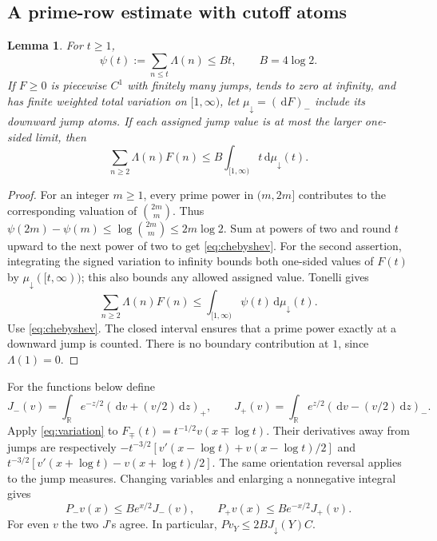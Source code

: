 \documentclass[11pt]{article}
\newtheorem{lemma}[theorem]{Lemma}
\theoremstyle{remark}\newtheorem{remark}[theorem]{Remark}
\newcommand{\R}{\mathbb R}
\newcommand{\dd}{\,\mathrm d}
\numberwithin{equation}{section}
\begin{document}
\subsection{A prime-row estimate with cutoff atoms}
\begin{lemma}\label{lem:chebyshev}
For $t\ge1$,
\begin{equation}\label{eq:chebyshev}
 \psi(t):=\sum_{n\le t}\Lambda(n)\le Bt,\qquad B=4\log2.
\end{equation}
If $F\ge0$ is piecewise $C^1$ with finitely many jumps, tends to zero at infinity, and has finite weighted total variation on $[1,\infty)$, let $\mu_\downarrow=(\dd F)_-$ include its downward jump atoms. If each assigned jump value is at most the larger one-sided limit, then
\begin{equation}\label{eq:variation}
 \sum_{n\ge2}\Lambda(n)F(n)
 \le B\int_{[1,\infty)}t\dd\mu_\downarrow(t).
\end{equation}
\end{lemma}
\begin{proof}
For an integer $m\ge1$, every prime power in $(m,2m]$ contributes to the corresponding valuation of $\binom{2m}{m}$. Thus
$\psi(2m)-\psi(m)\le\log\binom{2m}{m}\le2m\log2$.
Sum at powers of two and round $t$ upward to the next power of two to get \eqref{eq:chebyshev}.
For the second assertion, integrating the signed variation to infinity bounds both one-sided values of $F(t)$ by
$\mu_\downarrow([t,\infty))$; this also bounds any allowed assigned value. Tonelli gives
\[
 \sum_{n\ge2}\Lambda(n)F(n)
 \le\int_{[1,\infty)}\psi(t)\dd\mu_\downarrow(t).
\]
Use \eqref{eq:chebyshev}. The closed interval ensures that a prime power exactly at a downward jump is counted. There is no boundary contribution at $1$, since $\Lambda(1)=0$.
\end{proof}

For the functions below define
\[
 J_-(v)=\int_\R e^{-z/2}(\dd v+(v/2)\dd z)_+,
 \qquad J_+(v)=\int_\R e^{z/2}(\dd v-(v/2)\dd z)_-.
\]
Apply \eqref{eq:variation} to $F_\mp(t)=t^{-1/2}v(x\mp\log t)$.
Their derivatives away from jumps are respectively
$-t^{-3/2}[v'(x-\log t)+v(x-\log t)/2]$ and
$t^{-3/2}[v'(x+\log t)-v(x+\log t)/2]$.
The same orientation reversal applies to the jump measures. Changing variables and enlarging a nonnegative integral gives
\begin{equation}\label{eq:Pvariation}
 P_-v(x)\le Be^{x/2}J_-(v),\qquad
 P_+v(x)\le Be^{-x/2}J_+(v).
\end{equation}
For even $v$ the two $J$'s agree. In particular,
$Pv_Y\le2BJ_\downarrow(Y)C$.
\end{document}
